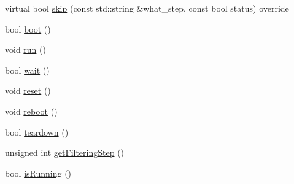 \begin{DoxyCompactItemize}
virtual bool \mbox{\hyperlink{classbfl_1_1ParticleFilter_a2d7a5e7aaad179037273d35be229056d}{skip}} (const std\+::string \&what\+\_\+step, const bool status) override
\item 
bool \mbox{\hyperlink{classbfl_1_1FilteringAlgorithm_a96651f8464190c0a56d79219a1017147}{boot}} ()
\item 
void \mbox{\hyperlink{classbfl_1_1FilteringAlgorithm_a009cbe5f4bbb16967f6c6ddcaed8fbb1}{run}} ()
\item 
bool \mbox{\hyperlink{classbfl_1_1FilteringAlgorithm_a40372c24fa050eb0274371172df0a244}{wait}} ()
\item 
void \mbox{\hyperlink{classbfl_1_1FilteringAlgorithm_a2403c62fbd7bd7f5cda56a84f5f30331}{reset}} ()
\item 
void \mbox{\hyperlink{classbfl_1_1FilteringAlgorithm_a6022859aa985474fb997343cc935b11e}{reboot}} ()
\item 
bool \mbox{\hyperlink{classbfl_1_1FilteringAlgorithm_a1dc912d89ee8f96d4f3e8209865c5308}{teardown}} ()
\item 
unsigned int \mbox{\hyperlink{classbfl_1_1FilteringAlgorithm_a8c43b1f3dac30934c0a03de348d4a29d}{get\+Filtering\+Step}} ()
\item 
bool \mbox{\hyperlink{classbfl_1_1FilteringAlgorithm_a5cfecab2c778620e2557237472bb1721}{is\+Running}} ()
\end{DoxyCompactItemize}
